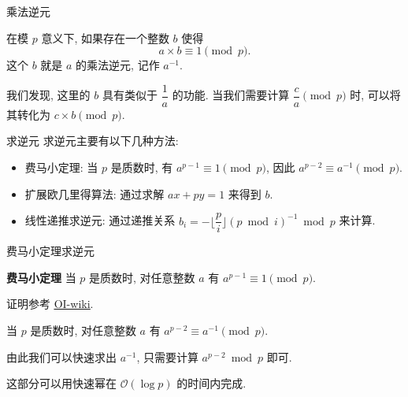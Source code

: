\documentclass[aspectratio=169]{beamer}  %
\newcommand{\pau}{\pause}
\begin{document}
\begin{frame}{乘法逆元}
  \begin{definition}
    在模 $p$ 意义下, 如果存在一个整数 $b$ 使得
    $$a \times b \equiv 1 \pmod{p} \text{.}$$
    这个 $b$ 就是 $a$ 的乘法逆元, 记作 $a^{-1}$.
  \end{definition}\pau

  \vspace{1em}

  我们发现, 这里的 $b$ 具有类似于 $\dfrac{1}{a}$ 的功能. 
  当我们需要计算 $\displaystyle \dfrac{c}{a} \pmod{p}$ 时, 可以将其转化为 $c \times b \pmod{p}$.
\end{frame}

\begin{frame}{求逆元}
  求逆元主要有以下几种方法:\pau
  \begin{itemize}
    \item 费马小定理: 当 $p$ 是质数时, 有 $a^{p-1} \equiv 1 \pmod{p}$, 因此 $a^{p-2} \equiv a^{-1} \pmod{p}$.\pau
    \item 扩展欧几里得算法: 通过求解 $ax + py = 1$ 来得到 $b$.\pau
    \item 线性递推求逆元: 通过递推关系 $b_i = -\lfloor \dfrac{p}{i} \rfloor (p \bmod i)^{-1} \bmod{p}$ 来计算.\pau
  \end{itemize}
\end{frame}
  
\begin{frame}{费马小定理求逆元}
  \begin{theorem}{\textbf{费马小定理}}
    当 $p$ 是质数时, 对任意整数 $a$ 有 $a^{p-1} \equiv 1 \pmod{p}$.
  \end{theorem}

  证明参考 \href{https://oi-wiki.org/math/number-theory/inverse}{\color{magenta}\underline{OI-wiki}}.\pau

  \begin{corollary}
    当 $p$ 是质数时, 对任意整数 $a$ 有 $a^{p-2} \equiv a^{-1} \pmod{p}$.
  \end{corollary}\pau

  由此我们可以快速求出 $a^{-1}$, 只需要计算 $a^{p-2} \bmod p$ 即可.

  \vspace{1em}

  这部分可以用快速幂在 $\mathcal{O}(\log p)$ 的时间内完成.
\end{frame}
  
\end{document}
